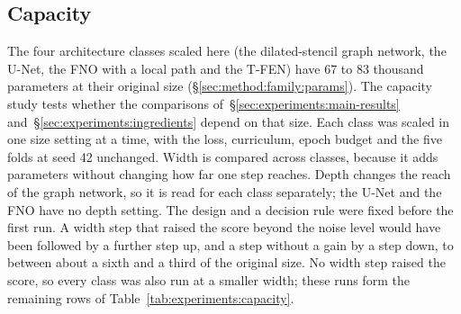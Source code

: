 
\subsection{Capacity}
\label{sec:experiments:ablations:capacity}

The four architecture classes scaled here (the dilated-stencil graph
network, the U-Net, the FNO with a local path and the T-FEN) have 67 to 83
thousand parameters at their original size
(\S\ref{sec:method:family:params}). The capacity study
tests whether the comparisons of~\S\ref{sec:experiments:main-results}
and~\S\ref{sec:experiments:ingredients} depend on that size. Each class was
scaled in one size setting at a time, with the loss, curriculum, epoch
budget and the five folds at seed 42 unchanged. Width is compared across
classes, because it adds parameters without changing how far one step
reaches. Depth changes the reach of the graph network, so it is read for
each class separately; the U-Net and the FNO have no depth setting. The
design and a decision rule were fixed before the first run. A width step
that raised the score beyond the noise level would have been followed by a
further step up, and a step without a gain by a step down, to between
about a sixth and a third of the original size. No width step raised the
score, so every class was also run at a smaller width; these runs form the
remaining rows of Table~\ref{tab:experiments:capacity}.


